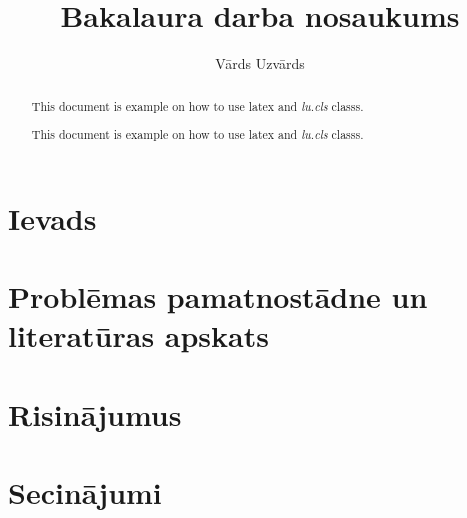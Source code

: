 \documentclass{LU}
\title{Bakalaura darba nosaukums}
\author{Vārds Uzvārds}
\begin{document}
\maketitle

\begin{abstract}
This document is example on how to use latex and \textit{lu.cls} classs.
\end{abstract}
 

\begin{abstract}
This document is example on how to use latex and \textit{lu.cls} classs.
\end{abstract}


\tableofcontents


\printglossary[type=main,title={Apzīmējumu saraksts},toctitle={Apzīmējumu saraksts}]


\chapter*{Ievads} %
\pagestyle{plain}



\chapter{Problēmas pamatnostādne un literatūras apskats}


\chapter{Risinājumus}



\chapter*{Secinājumi}

\end{document}
